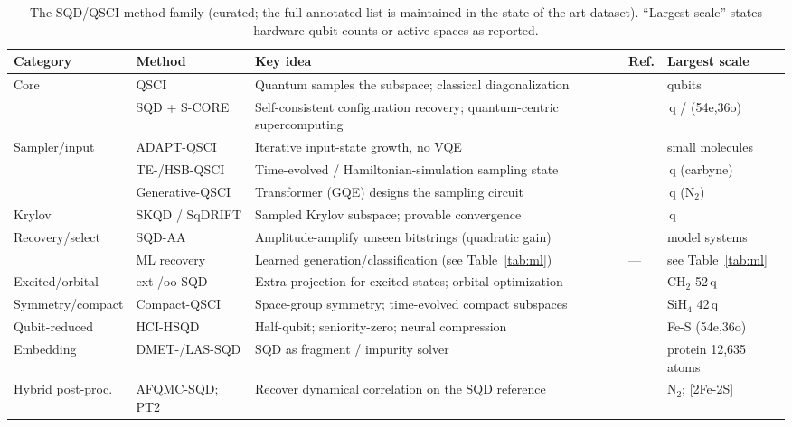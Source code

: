 \documentclass[11pt]{article}
\begin{document}
\begin{table}[t]\centering\footnotesize
\caption{The SQD/QSCI method family (curated; the full annotated list is maintained in the state-of-the-art dataset). ``Largest scale'' states hardware qubit counts or active spaces as reported.}
\label{tab:sqd}
\renewcommand{\arraystretch}{1.25}
\begin{tabularx}{\textwidth}{@{}>{\raggedright\arraybackslash}p{2.6cm} >{\raggedright\arraybackslash}p{2.0cm} >{\raggedright\arraybackslash}X >{\raggedright\arraybackslash}p{2.4cm} >{\raggedright\arraybackslash}p{1.8cm}@{}}
\toprule
\textbf{Category} & \textbf{Method} & \textbf{Key idea} & \textbf{Ref.} & \textbf{Largest scale} \\
\midrule
Core & QSCI & Quantum samples the subspace; classical diagonalization & \cite{kanno2023} & 8 qubits \\
 & SQD + S-CORE & Self-consistent configuration recovery; quantum-centric supercomputing & \cite{robledomoreno2025} & 77\,q / (54e,36o) \\
Sampler/input & ADAPT-QSCI & Iterative input-state growth, no VQE & \cite{nakagawa2024} & small molecules \\
 & TE-/HSB-QSCI & Time-evolved / Hamiltonian-simulation sampling state & \cite{mikkelsen2025,sugisaki2025} & 36\,q (carbyne) \\
 & Generative-QSCI & Transformer (GQE) designs the sampling circuit & \cite{kemmoku2026} & 32\,q (N$_2$) \\
Krylov & SKQD / SqDRIFT & Sampled Krylov subspace; provable convergence & \cite{yu2025,piccinelli2025} & 49\,q \\
Recovery/select & SQD-AA & Amplitude-amplify unseen bitstrings (quadratic gain) & \cite{stockinger2026} & model systems \\
 & ML recovery & Learned generation/classification (see Table~\ref{tab:ml}) & --- & see Table~\ref{tab:ml} \\
Excited/orbital & ext-/oo-SQD & Extra projection for excited states; orbital optimization & \cite{barison2025} & CH$_2$ 52\,q \\
Symmetry/compact & Compact-QSCI & Space-group symmetry; time-evolved compact subspaces & \cite{weaving2025,nogaki2026} & SiH$_4$ 42\,q \\
Qubit-reduced & HCI-HSQD & Half-qubit; seniority-zero; neural compression & \cite{mcfarthing2026} & Fe-S (54e,36o) \\
Embedding & DMET-/LAS-SQD & SQD as fragment / impurity solver & \cite{wang2026} & protein 12{,}635 atoms \\
Hybrid post-proc. & AFQMC-SQD; PT2 & Recover dynamical correlation on the SQD reference & \cite{danilov2025,erhart2025} & N$_2$; [2Fe-2S] \\
\bottomrule
\end{tabularx}
\end{table}
\end{document}
